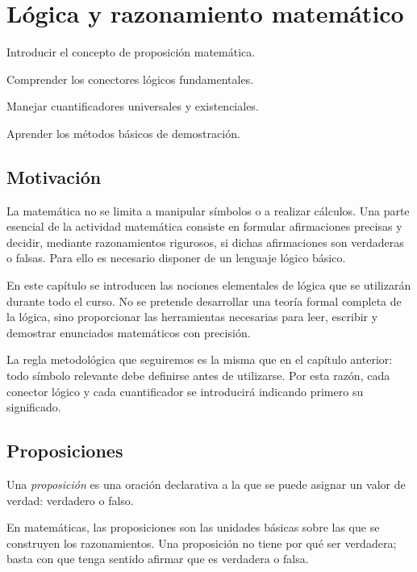 \chapter{Lógica y razonamiento matemático}

\begin{objetivos}
  \item Introducir el concepto de proposición matemática.
  \item Comprender los conectores lógicos fundamentales.
  \item Manejar cuantificadores universales y existenciales.
  \item Aprender los métodos básicos de demostración.
\end{objetivos}

\section{Motivación}

La matemática no se limita a manipular símbolos o a realizar cálculos. Una parte esencial de la actividad matemática consiste en formular afirmaciones precisas y decidir, mediante razonamientos rigurosos, si dichas afirmaciones son verdaderas o falsas. Para ello es necesario disponer de un lenguaje lógico básico.

En este capítulo se introducen las nociones elementales de lógica que se utilizarán durante todo el curso. No se pretende desarrollar una teoría formal completa de la lógica, sino proporcionar las herramientas necesarias para leer, escribir y demostrar enunciados matemáticos con precisión.

La regla metodológica que seguiremos es la misma que en el capítulo anterior: todo símbolo relevante debe definirse antes de utilizarse. Por esta razón, cada conector lógico y cada cuantificador se introducirá indicando primero su significado.

\section{Proposiciones}
\label{sec:proposiciones}

\begin{definicion}[Proposición]
Una \emph{proposición} es una oración declarativa a la que se puede asignar un valor de verdad: verdadero o falso.
\end{definicion}

En matemáticas, las proposiciones son las unidades básicas sobre las que se construyen los razonamientos. Una proposición no tiene por qué ser verdadera; basta con que tenga sentido afirmar que es verdadera o falsa.

